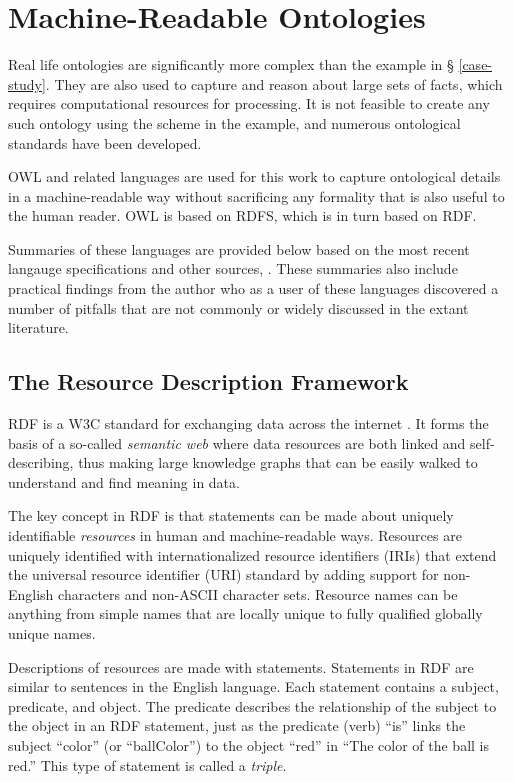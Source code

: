 \section{Machine-Readable Ontologies}

Real life ontologies are significantly more complex than the example in \S
\ref{case-study}. They are also used to capture and reason about large sets of
facts, which requires computational resources for processing. It is not feasible
to create any such ontology using the scheme in the example, and numerous
ontological standards have been developed. 

OWL and related languages are used for this work to
capture ontological details in a machine-readable way without sacrificing any
formality that is also useful to the human reader. OWL is based on RDFS, which
is in turn based on RDF.

Summaries of these languages are provided below based on the most recent
langauge specifications and other sources, \cite{allemang_semantic_2008}. These
summaries also include practical findings from the author who as a user of
these languages discovered a number of pitfalls that are not commonly or widely
discussed in the extant literature.

\subsection{The Resource Description Framework}

RDF is a W3C standard for exchanging data
across the internet \cite{noauthor_rdf_nodate}\cite{noauthor_rdf_nodate-3}. It
forms the basis of a so-called \textit{semantic web} where data resources are both linked and
self-describing, thus making large knowledge graphs that can be easily walked
to understand and find meaning in data.

The key concept in RDF is that statements can be made about uniquely
identifiable \textit{resources} in human and machine-readable ways. Resources
are uniquely identified with internationalized resource identifiers (IRIs) that
extend the universal resource identifier (URI) standard by adding support for
non-English characters and non-ASCII character sets. Resource names can be
anything from simple names that are locally unique to fully qualified globally
unique names.

Descriptions of resources are made with statements. Statements in RDF are
similar to sentences in the English language. Each statement contains a subject,
predicate, and object. The predicate describes the relationship of the subject
to the object in an RDF statement, just as the predicate (verb) ``is'' links the
subject ``color'' (or ``ballColor'') to the object ``red'' in ``The color of
the ball is red.'' This type of statement is called a \textit{triple}.

